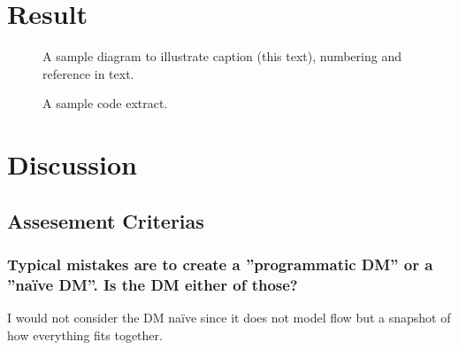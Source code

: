 \documentclass[a4paper]{scrreprt}
\begin{document}
\chapter{Result}
\label{sec:result}


\begin{figure}[h!]
  \begin{center}
    \caption{A sample diagram to illustrate caption (this text), numbering and reference in text.}
    \label{fig:diag}
  \end{center}
\end{figure}

\begin{figure}[h!]
  \begin{center}
    \caption{A sample code extract.}
    \label{fig:code}
  \end{center}
\end{figure}

\chapter{Discussion}


    \section{Assesement Criterias}
        \subsection{Typical mistakes are to create a ''programmatic DM'' or a ''naïve DM''. Is the DM either of those?}
            I would not consider the DM naïve since it does not model flow but a
            snapshot of how everything fits together.
\end{document}
